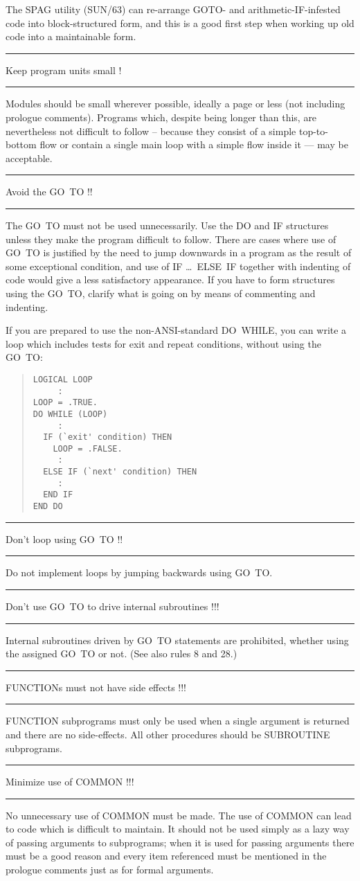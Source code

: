 \documentclass[twoside,11pt]{article}
\newcounter{sruleno}
\newcommand{\srule}[1]{
    \addtocounter{sruleno}{1}
    \goodbreak
    \rule[0.5ex]{\textwidth}{0.3mm}
    {\Large #1 \hfill {\thesruleno}}
    \rule[0.5ex]{\textwidth}{0.1mm}
}
\newcommand{\srule}[1]{
       \addtocounter{sruleno}{1}
       \begin{rawhtml} <HR> \end{rawhtml}
       {\Large \thesruleno}~~~~{\Large #1}
       \begin{rawhtml} <HR> \end{rawhtml}
       \end{tabular}
  }
\renewcommand{\_}{{\tt\char'137}}
\begin{document}
The SPAG utility (SUN/63) can re-arrange GOTO- and arithmetic-IF-infested
code into block-structured form, and this is a good first step when
working up old code into a maintainable form.

\srule{Keep program units small !}
Modules should be small wherever possible, ideally a page or less (not
including prologue comments).
Programs which,
despite being longer than this,
are nevertheless not difficult to follow
-- because they consist of a simple top-to-bottom flow or contain a single main
loop with a simple flow inside it --- may be acceptable.

\srule{Avoid the GO~TO !!}
The GO~TO must not be used unnecessarily.
Use the DO and IF structures unless they make the program difficult to follow.
There are cases where use of GO~TO is justified by the need to jump downwards
in a program as the result of some exceptional condition, and use of
IF \ldots\ ELSE~IF together with indenting of code would give a less
satisfactory appearance.  If you have to form structures using
the GO~TO, clarify what is going on by means of commenting and indenting.

\goodbreak
If you are prepared to use the non-ANSI-standard DO~WHILE, you can write a
loop which includes tests for exit and repeat conditions,
without using the GO~TO:
\begin{quote}
\begin{verbatim}
LOGICAL LOOP
     :
LOOP = .TRUE.
DO WHILE (LOOP)
     :
  IF (`exit' condition) THEN
    LOOP = .FALSE.
     :
  ELSE IF (`next' condition) THEN
     :
  END IF
END DO
\end{verbatim}
\end{quote}

\srule{Don't loop using GO~TO !!}
Do not implement loops by jumping backwards using GO~TO.

\srule{Don't use GO~TO to drive internal subroutines !!!}
Internal subroutines driven by GO~TO statements are prohibited,
whether using the assigned GO~TO or not.  (See also rules 8 and 28.)

\srule{FUNCTIONs must not have side effects !!!}
FUNCTION subprograms must only be used when a single argument is returned and
there are no side-effects.
All other procedures should be SUBROUTINE subprograms.

\srule{Minimize use of COMMON !!!}
No unnecessary use of COMMON must be made.
The use of COMMON can lead to code which is difficult to maintain.
It should not be used simply as a lazy way of passing arguments to subprograms;
when it is used for passing arguments there must be a good reason and every item
referenced must be mentioned in the prologue comments just as for formal
arguments.
\end{document}
